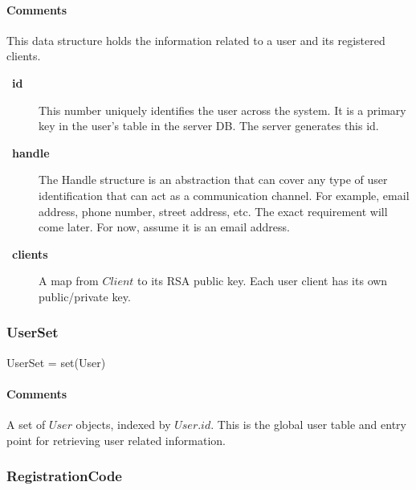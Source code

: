 \documentclass[a4paper,10pt]{article}
\let\Item\item
\newcommand\SpecialItem{\renewcommand\item[1][]{\Item[\textbullet~\bfseries##1]}
}
\begin{document}
\begin{inparaitem}[ ]
 \item \infrastructure
\end{inparaitem}

\paragraph*{Comments}
This data structure holds the information related to a user and its registered clients.

\SpecialItem
\begin{description}
 \item[id] This number uniquely identifies the user across the system. It is a primary key in the user's table in the server DB. The server generates this id.
 \item[handle] The Handle structure is an abstraction that can cover any type of user identification that can act as a communication channel. For example, email address, phone 
number, street address, etc. The exact requirement will come later. For now, assume it is an email address.
 \item[clients] A map from $Client$ to its RSA public key. Each user client has its own public/private key.
\end{description}

\subsubsection{UserSet}

\begin{verbbox}
UserSet = set(User)
\end{verbbox}
\begin{center}
\theverbbox
\end{center}

\begin{inparaitem}[ ]
 \item \secure
 \item \persistent
 \item \unique
\end{inparaitem}

\paragraph*{Comments}
A set of $User$ objects, indexed by $User.id$. This is the global user table and entry point for retrieving user related information.

\subsubsection{RegistrationCode}
\end{document}
